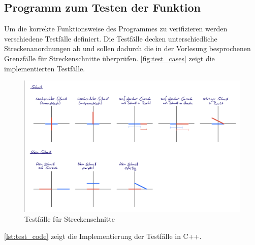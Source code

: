 \documentclass[12pt]{scrartcl}
\begin{document}
\subsection{Programm zum Testen der Funktion}
Um die korrekte Funktionsweise des Programmes zu verifizieren werden verschiedene Testfälle definiert.
Die Testfälle decken unterschiedliche Streckenanordnungen ab und sollen dadurch die in der Vorlesung besprochenen Grenzfälle für Streckenschnitte überprüfen.
\autoref{fig:test_cases} zeigt die implementierten Testfälle.

\begin{figure}[ht]
    \graphicspath{ {./pictures/} }
    \centering
    \includegraphics[scale=0.2]{Test_Vorlage.jpeg}
    \smallskip
    \caption{Testfälle für Streckenschnitte}
    \label{fig:test_cases}
\end{figure}

\autoref{lst:test_code} zeigt die Implementierung der Testfälle in C++.\\
\end{document}
